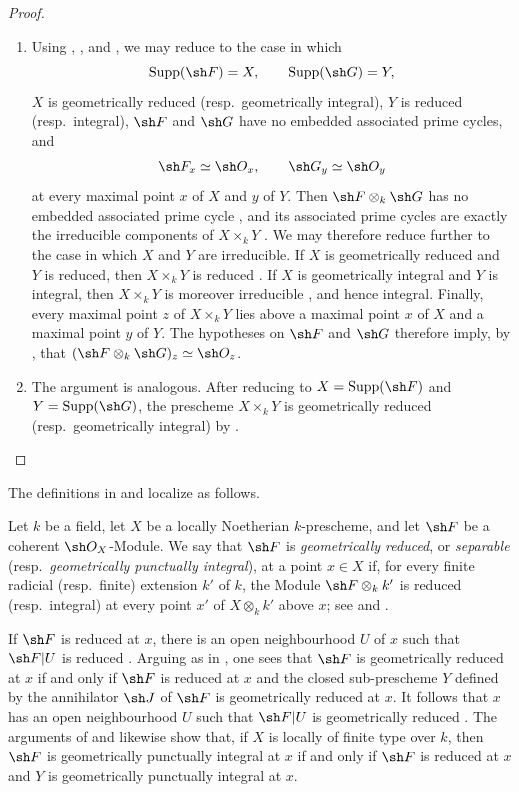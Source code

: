\begin{proof}
\begin{enumerate}
\item[\rm(i)]
Using , , and
, we may reduce to the case in which
\[
 \operatorname{Supp}(\sh F)=X,\qquad
 \operatorname{Supp}(\sh G)=Y,
\]
$X$ is geometrically reduced (resp.\ geometrically integral), $Y$ is
reduced (resp.\ integral), $\sh F$ and $\sh G$ have no embedded
associated prime cycles, and
\[
 \sh F_x\simeq\sh O_x,\qquad
 \sh G_y\simeq\sh O_y
\]
at every maximal point $x$ of $X$ and $y$ of $Y$.
Then $\sh F\otimes_k\sh G$ has no embedded associated prime cycle
, and its associated prime cycles are exactly the
irreducible components of $X\times_kY$ .
We may therefore reduce further to the case in which $X$ and $Y$ are
irreducible.
If $X$ is geometrically reduced and $Y$ is reduced, then
$X\times_kY$ is reduced .
If $X$ is geometrically integral and $Y$ is integral, then
$X\times_kY$ is moreover irreducible , and hence
integral.
Finally, every maximal point $z$ of $X\times_kY$ lies above a maximal
point $x$ of $X$ and a maximal point $y$ of $Y$.
The hypotheses on $\sh F$ and $\sh G$ therefore imply, by
, that
$(\sh F\otimes_k\sh G)_z\simeq\sh O_z$.

\item[\rm(ii)]
The argument is analogous.
After reducing to
$X=\operatorname{Supp}(\sh F)$ and
$Y=\operatorname{Supp}(\sh G)$, the prescheme $X\times_kY$ is
geometrically reduced (resp.\ geometrically integral) by
.
\end{enumerate}
\end{proof}

The definitions in  and  localize as
follows.

\begin{definition}[4.6.22]
\label{IV.4.6.22}
Let $k$ be a field, let $X$ be a locally Noetherian $k$-prescheme,
and let $\sh F$ be a coherent $\sh O_X$-Module.
We say that $\sh F$ is \emph{geometrically reduced}, or
\emph{separable} (resp.\ \emph{geometrically punctually integral}),
at a point $x\in X$ if, for every finite radicial
(resp.\ finite) extension $k'$ of $k$, the Module
$\sh F\otimes_k k'$ is reduced (resp.\ integral) at every point $x'$
of $X\otimes_k k'$ above $x$; see  and
.
\end{definition}

If $\sh F$ is reduced at $x$, there is an open neighbourhood $U$ of
$x$ such that $\sh F|U$ is reduced .
Arguing as in , one sees that $\sh F$ is
geometrically reduced at $x$ if and only if $\sh F$ is reduced at $x$
and the closed sub-prescheme $Y$ defined by the annihilator $\sh J$ of
$\sh F$ is geometrically reduced at $x$.
It follows that $x$ has an open neighbourhood $U$ such that
$\sh F|U$ is geometrically reduced .
The arguments of  and  likewise show
that, if $X$ is locally of finite type over $k$, then $\sh F$ is
geometrically punctually integral at $x$ if and only if $\sh F$ is
reduced at $x$ and $Y$ is geometrically punctually integral at $x$.
